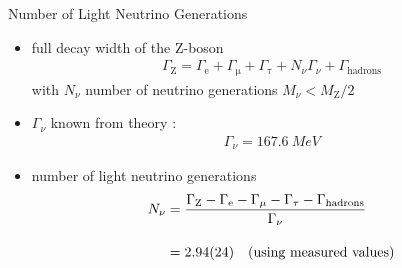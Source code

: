 \documentclass[11pt,xcolor=dvipsnames,professionalfonts]{beamer}
\begin{document}
\begin{frame}{Number of Light Neutrino Generations}
	\begin{itemize}
		\setlength\itemsep{2em}
		\item<1-> full decay width of the Z-boson
		\begin{align*}
			\Gamma_\mathrm{Z} = \Gamma_\mathrm{e} + \Gamma_\mathrm{\mu} + \Gamma_\mathrm{\tau} + N_\nu \Gamma_\nu + \Gamma_\mathrm{hadrons}
		\end{align*}
		with $N_\nu$ number of neutrino generations $M_\nu < M_\mathrm{Z} / 2$
		
		\item<2-> $\Gamma_\nu$ known from theory \cite{instructions}:
		\begin{align*}
			\Gamma_\nu = \SI{167.6}{MeV}
		\end{align*}
		
		\item<3-> number of light neutrino generations
			\begin{align*}
			N_\nu &= \frac{\Gamma_\mathrm{Z} - \Gamma_\mathrm{e} - \Gamma_\mathrm{\mu} - \Gamma_\mathrm{\tau} - \Gamma_\mathrm{hadrons}}{\Gamma_\nu} \\[1.0em]
			&= \num{2.94 +- 0.24} \quad \text{(using measured values)}
			\end{align*}
	\end{itemize}
\end{frame}
\end{document}
